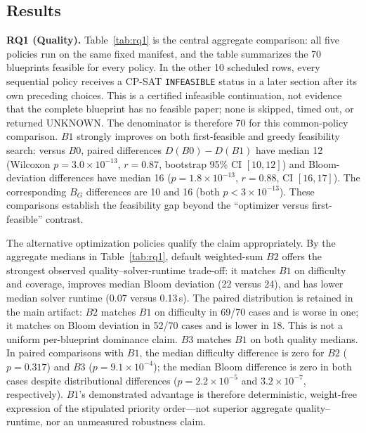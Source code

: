 \documentclass[runningheads]{llncs}
\begin{document}
\subsection{Results}
\noindent\textbf{RQ1 (Quality).} Table~\ref{tab:rq1} is the central aggregate comparison: all five policies run on the same fixed manifest, and the table summarizes the 70 blueprints feasible for every policy.
In the other 10 scheduled rows, every sequential policy receives a CP-SAT \texttt{INFEASIBLE} status in a later section after its own preceding choices.
This is a certified infeasible continuation, not evidence that the complete blueprint has no feasible paper;
none is skipped, timed out, or returned UNKNOWN. The denominator is therefore 70 for this common-policy comparison.
$B1$ strongly improves on both first-feasible and greedy feasibility search: versus $B0$, paired differences $D(B0)-D(B1)$ have median 12 (Wilcoxon $p=3.0{\times}10^{-13}$, $r=0.87$, bootstrap 95\% CI $[10,12]$) and Bloom-deviation differences have median 16 ($p=1.8{\times}10^{-13}$, $r=0.88$, CI $[16,17]$).
The corresponding $B_G$ differences are 10 and 16 (both $p<3{\times}10^{-13}$).
These comparisons establish the feasibility gap beyond the ``optimizer versus first-feasible'' contrast.

The alternative optimization policies qualify the claim appropriately.
By the aggregate medians in Table~\ref{tab:rq1}, default weighted-sum $B2$ offers the strongest observed quality--solver-runtime trade-off: it matches $B1$ on difficulty and coverage, improves median Bloom deviation (22 versus 24), and has lower median solver runtime (0.07 versus 0.13\,s).
The paired distribution is retained in the main artifact: $B2$ matches $B1$ on difficulty in 69/70 cases and is worse in one;
it matches on Bloom deviation in 52/70 cases and is lower in 18. This is not a uniform per-blueprint dominance claim.
$B3$ matches $B1$ on both quality medians. In paired comparisons with $B1$, the median difficulty difference is zero for $B2$ ($p=0.317$) and $B3$ ($p=9.1{\times}10^{-4}$);
the median Bloom difference is zero in both cases despite distributional differences ($p=2.2{\times}10^{-5}$ and $3.2{\times}10^{-7}$, respectively).
$B1$'s demonstrated advantage is therefore deterministic, weight-free expression of the stipulated priority order---not superior aggregate quality--runtime, nor an unmeasured robustness claim.
\end{document}
